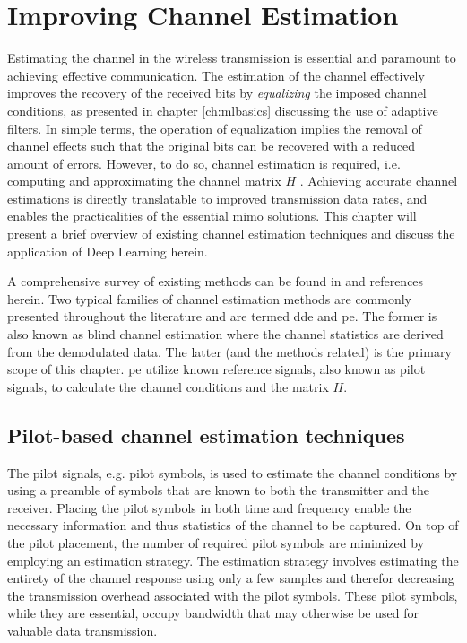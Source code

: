 \chapter{Improving Channel Estimation}\label{ch:channel_estimation}

Estimating the channel in the wireless transmission is essential and paramount to achieving effective communication. The estimation of the channel effectively improves the recovery of the received bits by \emph{equalizing} the imposed channel conditions, as presented in chapter \ref{ch:mlbasics} discussing the use of adaptive filters. In simple terms, the operation of equalization implies the removal of channel effects such that the original bits can be recovered with a reduced amount of errors. However, to do so, channel estimation is required, i.e. computing and approximating the channel matrix $H$ \cite{Cho2010MIMO-OFDMMATLAB}. Achieving accurate channel estimations is directly translatable to improved transmission data rates, and enables the practicalities of the essential \gls{mimo} solutions. This chapter will present a brief overview of existing channel estimation techniques and discuss the application of Deep Learning herein. 

A comprehensive survey of existing methods can be found in  \cite{Cho2010MIMO-OFDMMATLAB, Liu2014ChannelOFDM} and references herein. Two typical families of channel estimation methods are commonly presented throughout the literature and are termed \gls{dde} and \gls{pe}. The former is also known as blind channel estimation where the channel statistics are derived from the demodulated data. The latter (and the methods related) is the primary scope of this chapter. \gls{pe} utilize known reference signals, also known as pilot signals, to calculate the channel conditions and the matrix $H$.


\section{Pilot-based channel estimation techniques}\label{sec:channel_estimators}
The pilot signals, e.g. pilot symbols, is used to estimate the channel conditions by using a preamble of symbols that are known to both the transmitter and the receiver. Placing the pilot symbols in both time and frequency enable the necessary information and thus statistics of the channel to be captured. On top of the pilot placement, the number of required pilot symbols are minimized by employing an estimation strategy. The estimation strategy involves estimating the entirety of the channel response using only a few samples and therefor decreasing the transmission overhead associated with the pilot symbols. These pilot symbols, while they are essential, occupy bandwidth that may otherwise be used for valuable data transmission.

